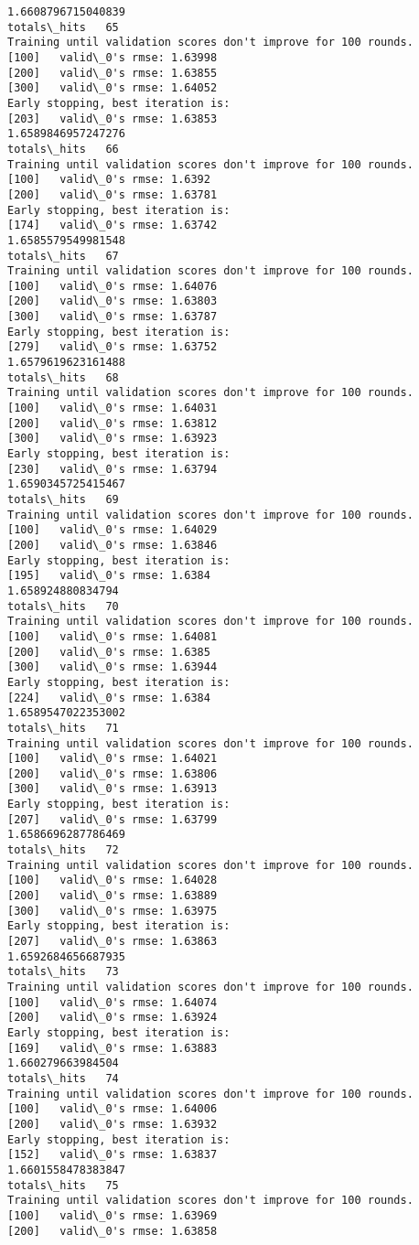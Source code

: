 \documentclass[11pt]{article}
\begin{document}
\begin{Verbatim}[commandchars=\\\{\}]
1.6608796715040839
totals\_hits   65
Training until validation scores don't improve for 100 rounds.
[100]	valid\_0's rmse: 1.63998
[200]	valid\_0's rmse: 1.63855
[300]	valid\_0's rmse: 1.64052
Early stopping, best iteration is:
[203]	valid\_0's rmse: 1.63853
1.6589846957247276
totals\_hits   66
Training until validation scores don't improve for 100 rounds.
[100]	valid\_0's rmse: 1.6392
[200]	valid\_0's rmse: 1.63781
Early stopping, best iteration is:
[174]	valid\_0's rmse: 1.63742
1.6585579549981548
totals\_hits   67
Training until validation scores don't improve for 100 rounds.
[100]	valid\_0's rmse: 1.64076
[200]	valid\_0's rmse: 1.63803
[300]	valid\_0's rmse: 1.63787
Early stopping, best iteration is:
[279]	valid\_0's rmse: 1.63752
1.6579619623161488
totals\_hits   68
Training until validation scores don't improve for 100 rounds.
[100]	valid\_0's rmse: 1.64031
[200]	valid\_0's rmse: 1.63812
[300]	valid\_0's rmse: 1.63923
Early stopping, best iteration is:
[230]	valid\_0's rmse: 1.63794
1.6590345725415467
totals\_hits   69
Training until validation scores don't improve for 100 rounds.
[100]	valid\_0's rmse: 1.64029
[200]	valid\_0's rmse: 1.63846
Early stopping, best iteration is:
[195]	valid\_0's rmse: 1.6384
1.658924880834794
totals\_hits   70
Training until validation scores don't improve for 100 rounds.
[100]	valid\_0's rmse: 1.64081
[200]	valid\_0's rmse: 1.6385
[300]	valid\_0's rmse: 1.63944
Early stopping, best iteration is:
[224]	valid\_0's rmse: 1.6384
1.6589547022353002
totals\_hits   71
Training until validation scores don't improve for 100 rounds.
[100]	valid\_0's rmse: 1.64021
[200]	valid\_0's rmse: 1.63806
[300]	valid\_0's rmse: 1.63913
Early stopping, best iteration is:
[207]	valid\_0's rmse: 1.63799
1.6586696287786469
totals\_hits   72
Training until validation scores don't improve for 100 rounds.
[100]	valid\_0's rmse: 1.64028
[200]	valid\_0's rmse: 1.63889
[300]	valid\_0's rmse: 1.63975
Early stopping, best iteration is:
[207]	valid\_0's rmse: 1.63863
1.6592684656687935
totals\_hits   73
Training until validation scores don't improve for 100 rounds.
[100]	valid\_0's rmse: 1.64074
[200]	valid\_0's rmse: 1.63924
Early stopping, best iteration is:
[169]	valid\_0's rmse: 1.63883
1.660279663984504
totals\_hits   74
Training until validation scores don't improve for 100 rounds.
[100]	valid\_0's rmse: 1.64006
[200]	valid\_0's rmse: 1.63932
Early stopping, best iteration is:
[152]	valid\_0's rmse: 1.63837
1.6601558478383847
totals\_hits   75
Training until validation scores don't improve for 100 rounds.
[100]	valid\_0's rmse: 1.63969
[200]	valid\_0's rmse: 1.63858

\end{Verbatim}
\end{document}

